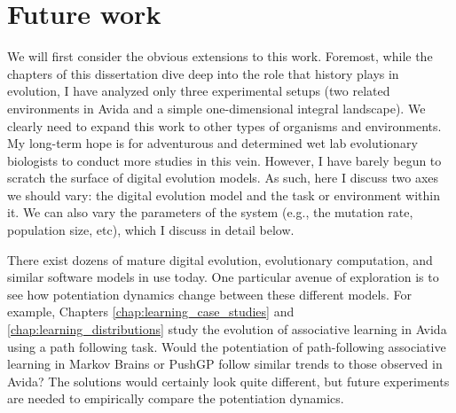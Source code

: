 \section{Future work}



We will first consider the obvious extensions to this work. 
Foremost, while the chapters of this dissertation dive deep into the role that history plays in evolution, I have analyzed only three experimental setups (two related environments in Avida and a simple one-dimensional integral landscape).
We clearly need to expand this work to other types of organisms and environments. 
My long-term hope is for adventurous and determined wet lab evolutionary biologists to conduct more studies in this vein. 
However, I have barely begun to scratch the surface of digital evolution models.
As such, here I discuss two axes we should vary: the digital evolution model and the task or environment within it.
We can also vary the parameters of the system (e.g., the mutation rate, population size, etc), which I discuss in detail below. 

There exist dozens of mature digital evolution, evolutionary computation, and similar software models in use today. 
One particular avenue of exploration is to see how potentiation dynamics change between these different models. 
For example, Chapters \ref{chap:learning_case_studies} and \ref{chap:learning_distributions} study the evolution of associative learning in Avida using a path following task. 
Would the potentiation of path-following associative learning in Markov Brains \citep{hintzeMarkovBrainsTechnical2017} or PushGP \citep{spectorGeneticProgrammingAutoconstructive2002} follow similar trends to those observed in Avida? 
The solutions would certainly look quite different, but future experiments are needed to empirically compare the potentiation dynamics.

